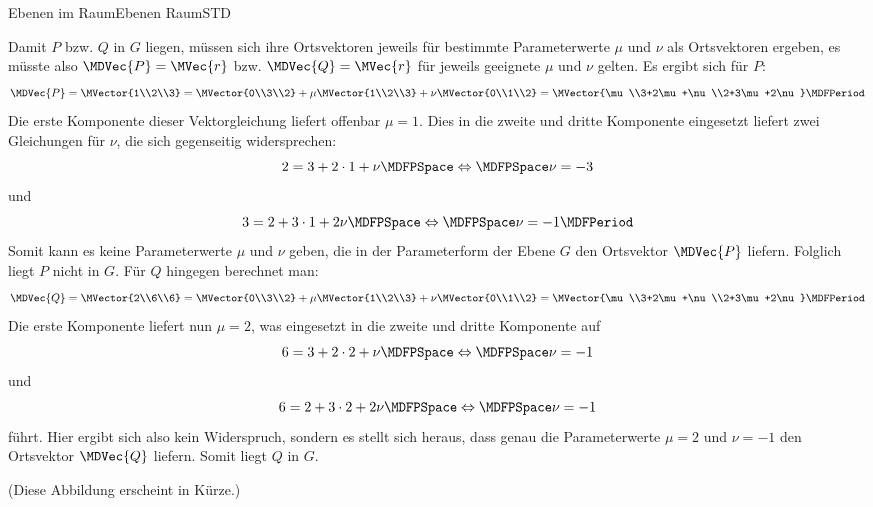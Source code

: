 \begin{MXContent}{Ebenen im Raum}{Ebenen Raum}{STD}
\begin{MExample}
\begin{itemize}
 Damit $P$ bzw. $Q$ in $G$ liegen, müssen sich ihre Ortsvektoren jeweils für bestimmte Parameterwerte $\mu$ und $\nu$ als Ortsvektoren ergeben, es müsste also $\MDVec{P}=\MVec{r}$ bzw. $\MDVec{Q}=\MVec{r}$ für jeweils geeignete $\mu$ und $\nu$ gelten. Es ergibt sich für $P$:
 \[
  \MDVec{P}=\MVector{1\\2\\3}=\MVector{0\\3\\2}+\mu\MVector{1\\2\\3}+\nu\MVector{0\\1\\2}=\MVector{\mu\\3+2\mu+\nu\\2+3\mu+2\nu}\MDFPeriod
 \]
 Die erste Komponente dieser Vektorgleichung liefert offenbar $\mu=1$. Dies in die zweite und dritte Komponente eingesetzt liefert zwei Gleichungen für $\nu$, die sich gegenseitig widersprechen:
 \[
  2=3+2\cdot 1+\nu\MDFPSpace\Leftrightarrow\MDFPSpace\nu=-3
 \]
 und
 \[
  3=2+3\cdot 1+2\nu\MDFPSpace\Leftrightarrow\MDFPSpace\nu=-1\MDFPeriod 
 \]
 Somit kann es keine Parameterwerte $\mu$ und $\nu$ geben, die in der Parameterform der Ebene $G$ den Ortsvektor $\MDVec{P}$ liefern. Folglich liegt $P$ nicht in $G$. Für $Q$ hingegen berechnet man:
 \[
  \MDVec{Q}=\MVector{2\\6\\6}=\MVector{0\\3\\2}+\mu\MVector{1\\2\\3}+\nu\MVector{0\\1\\2}=\MVector{\mu\\3+2\mu+\nu\\2+3\mu+2\nu}\MDFPeriod
 \]
 Die erste Komponente liefert nun $\mu=2$, was eingesetzt in die zweite und dritte Komponente auf
 \[
  6=3+2\cdot 2+\nu\MDFPSpace\Leftrightarrow\MDFPSpace\nu=-1
 \]
 und
 \[
  6=2+3\cdot 2+2\nu\MDFPSpace\Leftrightarrow\MDFPSpace\nu=-1
 \]
 führt. Hier ergibt sich also kein Widerspruch, sondern es stellt sich heraus, dass genau die Parameterwerte $\mu=2$ und $\nu=-1$ den Ortsvektor $\MDVec{Q}$ liefern. Somit liegt $Q$ in $G$.
 
 (Diese Abbildung erscheint in Kürze.)
 
\end{itemize}
\end{MExample}


\end{MXContent}
